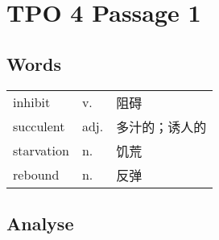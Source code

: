 \section{TPO 4 Passage 1}

\subsection{Words}

\begin{tabular}{lll}
    inhibit    & v.   & 阻碍      \\
    succulent  & adj. & 多汁的；诱人的 \\
    starvation & n.   & 饥荒      \\
    rebound    & n.   & 反弹      \\
\end{tabular}

\subsection{Analyse}

